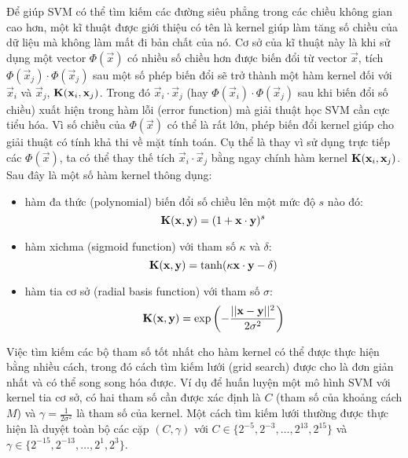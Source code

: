 Để giúp SVM có thể tìm kiếm các đường siêu phẳng trong các chiều không gian cao hơn, một kĩ thuật được giới thiệu có tên là kernel giúp làm tăng số chiều của dữ liệu mà không làm mất đi bản chất của nó. Cơ sở của kĩ thuật này là khi sử dụng một vector $\Phi(\vec{x})$ có nhiều số chiều hơn được biến đổi từ vector $\vec{x}$, tích $\Phi(\vec{x}_j)\cdot\Phi(\vec{x}_j)$ sau một số phép biến đổi sẽ trở thành một hàm kernel đối với $\vec{x}_i$ và $\vec{x}_j$, $\operatorname{\mathbf{K}}(\mathbf{x}_i,\mathbf{x}_j)$. Trong đó $\vec{x}_i\cdot \vec{x}_j$ (hay $\Phi(\vec{x}_i)\cdot\Phi(\vec{x}_j)$ sau khi biến đổi số chiều) xuất hiện trong hàm lỗi (error function) mà giải thuật học SVM cần cực tiểu hóa. Vì số chiều của $\Phi(\vec{x})$ có thể là rất lớn, phép biến đổi kernel giúp cho giải thuật có tính khả thi về mặt tính toán. Cụ thể là thay vì sử dụng trực tiếp các $\Phi(\vec{x})$, ta có thể thay thế tích $\vec{x}_i\cdot\vec{x}_j$ bằng ngay chính hàm kernel $\operatorname{\mathbf{K}}(\mathbf{x}_i,\mathbf{x}_j)$. Sau đây là một số hàm kernel thông dụng:

\begin{itemize}
\item hàm đa thức (polynomial) biến đổi số chiều lên một mức độ $s$ nào đó:
\[\operatorname{\mathbf{K}}(\mathbf{x},\mathbf{y})=(1+\mathbf{x}\cdot\mathbf{y})^s\]
\item hàm xichma (sigmoid function) với tham số $\kappa$ và $\delta$:
\[\operatorname{\mathbf{K}}(\mathbf{x},\mathbf{y})=\tanh(\kappa \mathbf{x}\cdot \mathbf{y}-\delta)\]
\item hàm tia cơ sở (radial basis function) với tham số $\sigma$:
\[\operatorname{\mathbf{K}}(\mathbf{x},\mathbf{y})=\exp\left(-\frac{||\mathbf{x}-\mathbf{y}||^2}{2\sigma^2}\right)\]
\end{itemize}

Việc tìm kiếm các bộ tham số tốt nhất cho hàm kernel có thể được thực hiện bằng nhiều cách, trong đó cách tìm kiếm lưới (grid search) được cho là đơn giản nhất và có thể song song hóa được. Ví dụ để huấn luyện một mô hình SVM với kernel tia cơ sở, có hai tham số cần được xác định là $C$ (tham số của khoảng cách $M$) và $\gamma=\frac{1}{2\sigma^2}$ là tham số của kernel. Một cách tìm kiếm lưới thường được thực hiện là duyệt toàn bộ các cặp $(C,\gamma)$ với $C\in\{2^{-5},2^{-3},\dots,2^{13},2^{15}\}$ và $\gamma\in\{2^{-15},2^{-13},\dots,2^1,2^3\}$.


